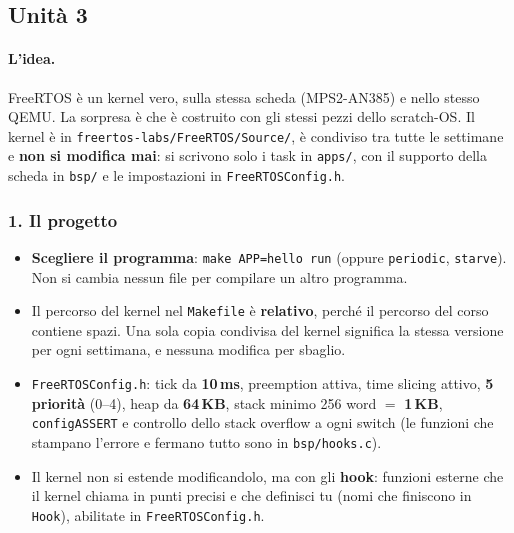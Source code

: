 \subsection{Unità 3}
\paragraph*{L'idea.} FreeRTOS è un kernel vero, sulla stessa scheda (MPS2-AN385) e nello stesso QEMU. La sorpresa è che è costruito con gli stessi pezzi dello scratch-OS. Il kernel è in \texttt{freertos-labs/FreeRTOS/Source/}, è condiviso tra tutte le settimane e \textbf{non si modifica mai}: si scrivono solo i task in \texttt{apps/}, con il supporto della scheda in \texttt{bsp/} e le impostazioni in \texttt{FreeRTOSConfig.h}.

\subsubsection*{1. Il progetto}
\begin{itemize}
    \item \textbf{Scegliere il programma}: \texttt{make APP=hello run} (oppure \texttt{periodic}, \texttt{starve}). Non si cambia nessun file per compilare un altro programma.
    \item Il percorso del kernel nel \texttt{Makefile} è \textbf{relativo}, perché il percorso del corso contiene spazi. Una sola copia condivisa del kernel significa la stessa versione per ogni settimana, e nessuna modifica per sbaglio.
    \item \texttt{FreeRTOSConfig.h}: tick da \textbf{10\,ms}, preemption attiva, time slicing attivo, \textbf{5 priorità} (0--4), heap da \textbf{64\,KB}, stack minimo 256 word $=$ \textbf{1\,KB}, \texttt{configASSERT} e controllo dello stack overflow a ogni switch (le funzioni che stampano l'errore e fermano tutto sono in \texttt{bsp/hooks.c}).
    \item Il kernel non si estende modificandolo, ma con gli \textbf{hook}: funzioni esterne che il kernel chiama in punti precisi e che definisci tu (nomi che finiscono in \texttt{Hook}), abilitate in \texttt{FreeRTOSConfig.h}.
\end{itemize}


